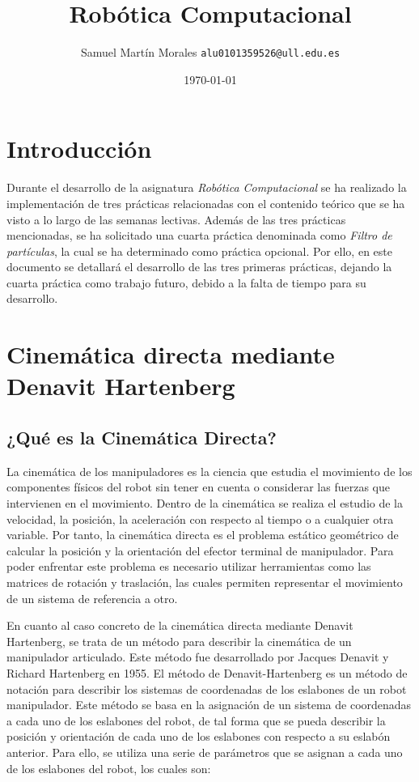 \documentclass[11pt]{report}
\begin{document}

\title{Robótica Computacional}
\author{Samuel Martín Morales  \texttt{alu0101359526@ull.edu.es}}
\date{\today}

\maketitle

\tableofcontents

\chapter{Introducción}

Durante el desarrollo de la asignatura \emph{Robótica Computacional} se ha realizado la implementación de tres prácticas relacionadas con el contenido teórico que se ha visto a lo largo de las semanas lectivas. Además de las tres prácticas mencionadas, se ha solicitado una cuarta práctica denominada como \emph{Filtro de partículas}, la cual se ha determinado como práctica opcional. Por ello, en este documento se detallará el desarrollo de las tres primeras prácticas, dejando la cuarta práctica como trabajo futuro, debido a la falta de tiempo para su desarrollo.

\chapter{Cinemática directa mediante Denavit Hartenberg}

\section{¿Qué es la Cinemática Directa?}

La cinemática de los manipuladores es la ciencia que estudia el movimiento de los componentes físicos del robot sin tener en cuenta o considerar las fuerzas que intervienen en el movimiento. Dentro de la cinemática se realiza el estudio de la velocidad, la posición, la aceleración con respecto al tiempo o a cualquier otra variable. Por tanto, la cinemática directa es el problema estático geométrico de calcular la posición y la orientación del efector terminal de manipulador. Para poder enfrentar este problema es necesario utilizar herramientas como las matrices de rotación y traslación, las cuales permiten representar el movimiento de un sistema de referencia a otro.

En cuanto al caso concreto de la cinemática directa mediante Denavit Hartenberg, se trata de un método para describir la cinemática de un manipulador articulado. Este método fue desarrollado por Jacques Denavit y Richard Hartenberg en 1955. El método de Denavit-Hartenberg es un método de notación para describir los sistemas de coordenadas de los eslabones de un robot manipulador. Este método se basa en la asignación de un sistema de coordenadas a cada uno de los eslabones del robot, de tal forma que se pueda describir la posición y orientación de cada uno de los eslabones con respecto a su eslabón anterior. Para ello, se utiliza una serie de parámetros que se asignan a cada uno de los eslabones del robot, los cuales son:
\end{document}
